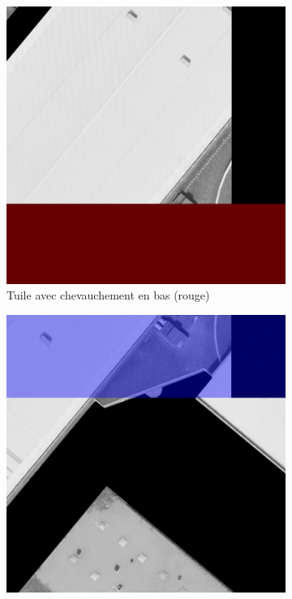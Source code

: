 \begin{figure}[H]
    \centering
    \begin{subfigure}[b]{0.49\textwidth}
        \centering
        \includegraphics[width=\textwidth]{02-main/figures/ch3/ch3_postprocessing_dataset_12_validation_chevauchement_bas1.png}
        \caption{Tuile avec chevauchement en bas (rouge)}
        \label{fig:ch3_postprocessing_dataset_12_validation_chevauchement_bas1}
    \end{subfigure}
    \hfill
    \begin{subfigure}[b]{0.49\textwidth}
        \centering
        \includegraphics[width=\textwidth]{02-main/figures/ch3/ch3_postprocessing_dataset_13_validation_chevauchement_bas2.png}

\end{subfigure}
\end{figure}
